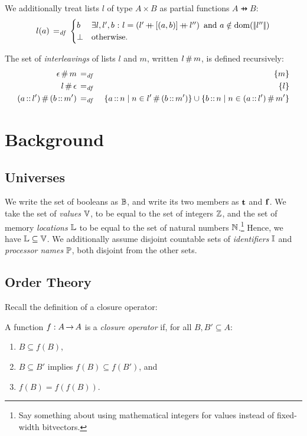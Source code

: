 \documentclass[11pt]{report}
\begin{document}
We additionally treat lists $l$ of type $A \times B$ as partial functions $A \pfun B$: \[ l(a) \eqdef \begin{cases}
	b & \text{$\exists l,l',b \st l = \left(l' \lapp \lsingle{(a,b)} \lapp l''\right) \text{ and }a \notin \dom{\elems{l''}}$} \\
	\bot & \text{otherwise.}
\end{cases}\] 

The set of \emph{interleavings} of lists $l$ and $m$, written $l \merge m$, is defined recursively: \begin{eqnarray*}
	\epsilon \merge m & \eqdef & \set{m} \\
	l \merge \epsilon & \eqdef & \set{l} \\
	(a \lcons l') \merge (b \lcons m') & \eqdef & \setof{a \lcons n}{n \in l' \merge (b \lcons m')} \cup \setof{b \lcons n}{n \in (a \lcons l') \merge m'}\\
\end{eqnarray*}


\chapter{Background} %
\label{cha:background}

\section{Universes} %
\label{sec:universes}

We write the set of booleans as $\setbooleans$, and write its two members as $\bvt$ and $\bvf$. We take the set of \emph{values} $\setvalues$, to be equal to the set of integers $\setintegers$, and the set of memory \emph{locations} $\setlocations$ to be equal to the set of natural numbers $\setnaturals$.\footnote{Say something about using mathematical integers for values instead of fixed-width bitvectors.} Hence, we have $\setlocations \subseteq \setvalues$. We additionally assume disjoint countable sets of \emph{identifiers} $\setidentifiers$ and \emph{processor names} $\setprocessors$, both disjoint from the other sets.


\section{Order Theory} %
\label{sec:order-theory}

Recall the definition of a closure operator: 
\begin{definition} 
\label{def:closure}
A function $f : A \tfun A$ is a \emph{closure
  operator} if, for all $B,B' \subseteq A$:
\begin{enumerate}
\item $B \subseteq f(B)$,
\item $B \subseteq B'$ implies $f(B) \subseteq f(B')$, and
\item $f(B) = f(f(B))$.
\end{enumerate}
\end{definition}
\end{document}
